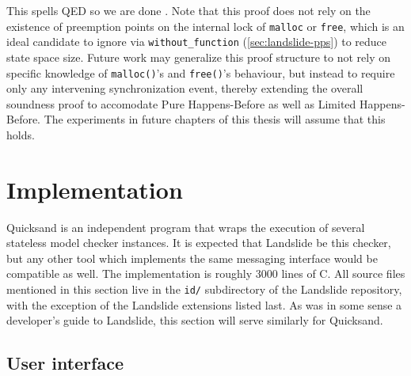 This spells QED so we are done \cite{vargomax}. %
Note that this proof does not rely on the existence of preemption points on
the internal lock of {\tt malloc} or {\tt free},
which is an ideal candidate to ignore via {\tt without\_function} (\cref{sec:landslide-pps})
to reduce state space size.
Future work may generalize this proof structure to not rely on specific knowledge
of {\tt malloc()}'s and {\tt free()}'s behaviour,
but instead to require only any intervening synchronization event,
thereby extending the overall soundness proof to accomodate Pure Happens-Before as well as Limited Happens-Before.
The experiments in future chapters of this thesis will assume that this holds.


\section{Implementation}
\label{sec:quicksand-implementation}

Quicksand is an independent program that wraps the execution of several stateless model checker instances.
It is expected that Landslide be this checker,
but any other tool which implements the same messaging interface would be compatible as well.
The implementation is roughly 3000 lines of C.
All source files mentioned in this section live in the {\tt id/} subdirectory of the Landslide repository,
with the exception of the Landslide extensions listed last.
As  was in some sense a developer's guide to Landslide,
this section will serve similarly for Quicksand.

\subsection{User interface}

